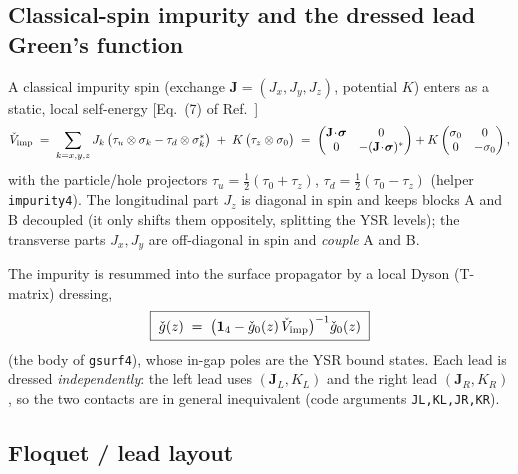 \documentclass[11pt,a4paper]{article}
\newcommand{\id}{\mathbf{1}}          %
\newcommand{\half}{\tfrac{1}{2}}
\begin{document}
\subsection{Classical-spin impurity and the dressed lead Green's function}
\label{sec:ysr_imp}

A classical impurity spin (exchange $\mathbf J=(J_x,J_y,J_z)$, potential $K$)
enters as a static, local self-energy [Eq.~(7) of Ref.~\cite{Lahiri2026YSR}]
\begin{equation}
  \check V_{\rm imp}
  \;=\; \sum_{k=x,y,z} J_k\,\big(\tau_u\otimes\sigma_k-\tau_d\otimes\sigma_k^{*}\big)
        \;+\; K\,\big(\tau_z\otimes\sigma_0\big)
  \;=\;
  \begin{pmatrix}
    \mathbf J\!\cdot\!\boldsymbol\sigma & 0\\
    0 & -(\mathbf J\!\cdot\!\boldsymbol\sigma)^{*}
  \end{pmatrix}
  + K
  \begin{pmatrix}\sigma_0 & 0\\ 0 & -\sigma_0\end{pmatrix},
  \label{eq:Vimp}
\end{equation}
with the particle/hole projectors $\tau_{u}=\half(\tau_0+\tau_z)$,
$\tau_{d}=\half(\tau_0-\tau_z)$ (helper \texttt{impurity4}).  The longitudinal
part $J_z$ is diagonal in spin and keeps blocks A and B decoupled (it only shifts
them oppositely, splitting the YSR levels); the transverse parts $J_x,J_y$ are
off-diagonal in spin and \emph{couple} A and B.

The impurity is resummed into the surface propagator by a local Dyson (T-matrix)
dressing,
\begin{equation}
  \boxed{\;\check g(z) \;=\; \big(\id_4-\check g_0(z)\,\check V_{\rm imp}\big)^{-1}\check g_0(z)\;}
  \label{eq:local_dyson}
\end{equation}
(the body of \texttt{gsurf4}), whose in-gap poles are the YSR bound states.  Each
lead is dressed \emph{independently}: the left lead uses $(\mathbf J_L,K_L)$ and
the right lead $(\mathbf J_R,K_R)$, so the two contacts are in general
inequivalent (code arguments \texttt{JL,KL,JR,KR}).

\subsection{Floquet / lead layout}
\label{sec:ysr_floquet}
\end{document}
